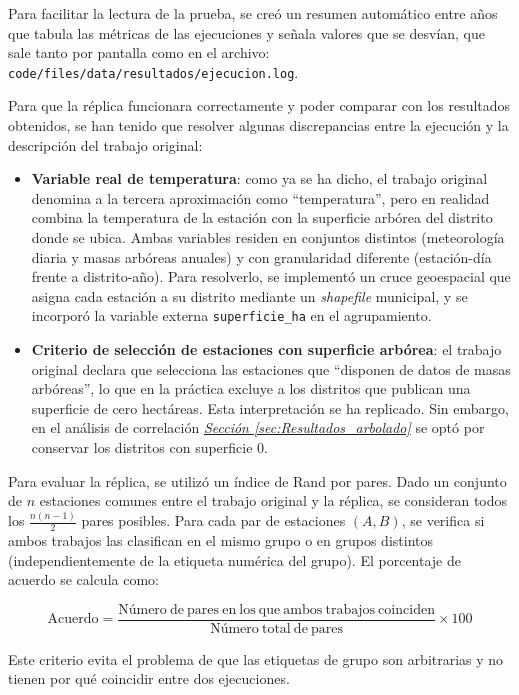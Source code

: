 Para facilitar la lectura de la prueba, se creó un resumen automático entre años que tabula las métricas de las ejecuciones y señala valores que se desvían, que sale tanto por pantalla como en el archivo: \\
\texttt{code/files/data/resultados/ejecucion.log}.

Para que la réplica funcionara correctamente y poder comparar con los resultados obtenidos, se han tenido que resolver algunas discrepancias entre la ejecución y la descripción del trabajo original:

\begin{itemize}
	\item \textbf{Variable real de temperatura}: como ya se ha dicho, el trabajo original denomina a la tercera aproximación como ``temperatura'', pero en realidad combina la temperatura de la estación con la superficie arbórea del distrito donde se ubica. Ambas variables residen en conjuntos distintos (meteorología diaria y masas arbóreas anuales) y con granularidad diferente (estación-día frente a distrito-año). Para resolverlo, se implementó un cruce geoespacial que asigna cada estación a su distrito mediante un \textit{shapefile} municipal, y se incorporó la variable externa \texttt{superficie\_ha} en el agrupamiento.
	\item \textbf{Criterio de selección de estaciones con superficie arbórea}: el trabajo original declara que selecciona las estaciones que ``disponen de datos de masas arbóreas'', lo que en la práctica excluye a los distritos que publican una superficie de cero hectáreas. Esta interpretación se ha replicado. Sin embargo, en el análisis de correlación \hyperref[sec:Resultados_arbolado]{\textit{Sección \ref*{sec:Resultados_arbolado}}} se optó por conservar los distritos con superficie 0.
\end{itemize}

Para evaluar la réplica, se utilizó un índice de Rand por pares. Dado un conjunto de $n$ estaciones comunes entre el trabajo original y la réplica, se consideran todos los $\frac{n(n-1)}{2}$ pares posibles. Para cada par de estaciones $(A, B)$, se verifica si ambos trabajos las clasifican en el mismo grupo o en grupos distintos (independientemente de la etiqueta numérica del grupo). El porcentaje de acuerdo se calcula como:

\[
\mathrm{Acuerdo} = \frac{\mathrm{Número\ de\ pares\ en\ los\ que\ ambos\ trabajos\ coinciden}}{\mathrm{Número\ total\ de\ pares}} \times 100
\]

Este criterio evita el problema de que las etiquetas de grupo son arbitrarias y no tienen por qué coincidir entre dos ejecuciones.

